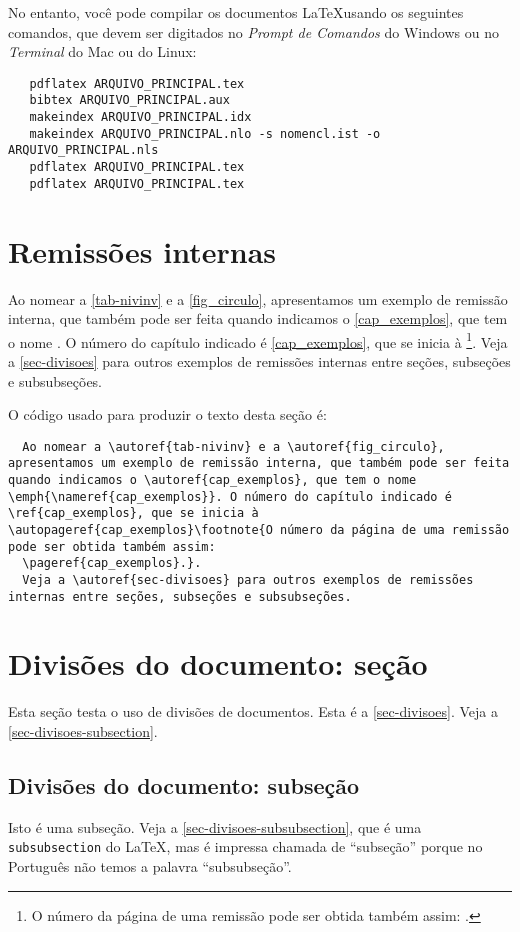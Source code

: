 No entanto, você pode compilar os documentos \LaTeX usando os seguintes comandos, que devem ser digitados no \emph{Prompt de Comandos} do Windows ou no \emph{Terminal} do Mac ou do Linux:

\begin{verbatim}
   pdflatex ARQUIVO_PRINCIPAL.tex
   bibtex ARQUIVO_PRINCIPAL.aux
   makeindex ARQUIVO_PRINCIPAL.idx 
   makeindex ARQUIVO_PRINCIPAL.nlo -s nomencl.ist -o ARQUIVO_PRINCIPAL.nls
   pdflatex ARQUIVO_PRINCIPAL.tex
   pdflatex ARQUIVO_PRINCIPAL.tex
\end{verbatim}

\section{Remissões internas}
Ao nomear a \autoref{tab-nivinv} e a \autoref{fig_circulo}, apresentamos um exemplo de remissão interna, que também pode ser feita quando indicamos o \autoref{cap_exemplos}, que tem o nome \emph{}. O número do capítulo indicado é \ref{cap_exemplos}, que se inicia à \footnote{O número da página de uma remissão pode ser obtida também assim: \pageref{cap_exemplos}.}. Veja a \autoref{sec-divisoes} para outros exemplos de remissões internas entre seções, subseções e subsubseções.

O código usado para produzir o texto desta seção é:

\begin{verbatim}
  Ao nomear a \autoref{tab-nivinv} e a \autoref{fig_circulo}, apresentamos um exemplo de remissão interna, que também pode ser feita quando indicamos o \autoref{cap_exemplos}, que tem o nome \emph{\nameref{cap_exemplos}}. O número do capítulo indicado é \ref{cap_exemplos}, que se inicia à \autopageref{cap_exemplos}\footnote{O número da página de uma remissão pode ser obtida também assim:
  \pageref{cap_exemplos}.}.
  Veja a \autoref{sec-divisoes} para outros exemplos de remissões internas entre seções, subseções e subsubseções.
\end{verbatim}

\section{Divisões do documento: seção}\label{sec-divisoes}
Esta seção testa o uso de divisões de documentos. Esta é a \autoref{sec-divisoes}. Veja a \autoref{sec-divisoes-subsection}.

\subsection{Divisões do documento: subseção}\label{sec-divisoes-subsection}
Isto é uma subseção. Veja a \autoref{sec-divisoes-subsubsection}, que é uma \texttt{subsubsection} do \LaTeX, mas é impressa chamada de ``subseção'' porque no Português não temos a palavra ``subsubseção''.

